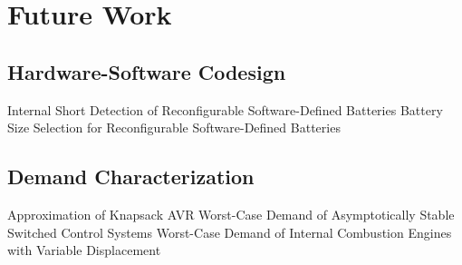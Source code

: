 \section{Future Work} \label{chap:futureWork}

\subsection{Hardware-Software Codesign}

Internal Short Detection of Reconfigurable Software-Defined Batteries
Battery Size Selection for Reconfigurable Software-Defined Batteries


\subsection{Demand Characterization}

Approximation of Knapsack AVR
Worst-Case Demand of Asymptotically Stable Switched Control Systems
Worst-Case Demand of Internal Combustion Engines with Variable Displacement